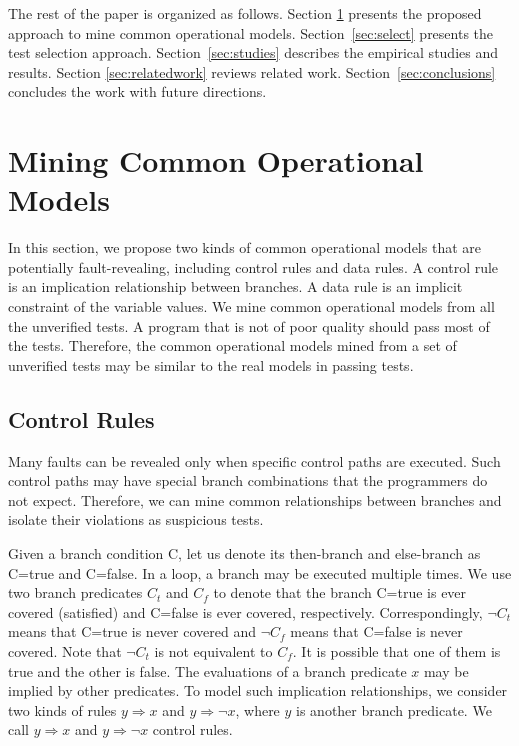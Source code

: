 \documentclass{sig-alternate}
\begin{document}
The rest of the paper is organized as follows. Section
\ref{sec:common} presents the proposed approach to mine common
operational models. Section~\ref{sec:select} presents the test
selection approach. Section~\ref{sec:studies} describes the
empirical studies and results. Section \ref{sec:relatedwork} reviews
related work. Section~\ref{sec:conclusions} concludes the work with
future directions.








\section{Mining Common Operational Models} \label{sec:common}

In this section, we propose two kinds of common operational models
that are potentially fault-revealing, including control rules and
data rules. A control rule is an implication relationship between
branches. A data rule is an implicit constraint of the variable
values. We mine common operational models from all the unverified
tests. A program that is not of poor quality should pass most of the
tests. Therefore, the common operational models mined from a set of
unverified tests may be similar to the real models in passing tests.



\subsection{Control Rules}

Many faults can be revealed only when specific control paths are
executed. Such control paths may have special branch combinations
that the programmers do not expect. Therefore, we can mine common
relationships between branches and isolate their violations as
suspicious tests.



Given a branch condition C, let us denote its then-branch and
else-branch as C=true and C=false. In a loop, a branch may be
executed multiple times. We use two branch predicates $C_t$ and
$C_f$ to denote that the branch C=true is ever covered (satisfied)
and C=false is ever covered, respectively. Correspondingly, $\neg
C_t$ means that C=true is never covered and $\neg C_f$ means that
C=false is never covered. Note that $\neg C_t$ is not equivalent to
$C_f$. It is possible that one of them is true and the other is
false. The evaluations of a branch predicate $x$ may be implied by
other predicates. To model such implication relationships, we
consider two kinds of rules $y\Rightarrow x$ and $y\Rightarrow \neg
x$, where
$y$ is another branch predicate. %
We call $y\Rightarrow x$ and $y\Rightarrow \neg x$ control rules.
\end{document}
